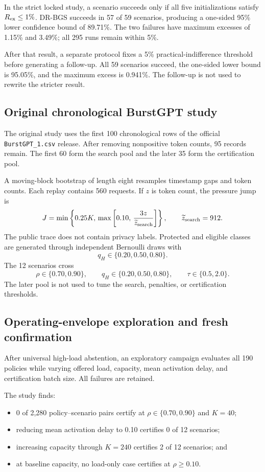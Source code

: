 \documentclass[futureinternet,supfile,submit,moreauthors]{Definitions/mdpi}
\begin{document}
In the strict locked study, a scenario succeeds only if all five
initializations satisfy \(R_{\rm ex}\leq1\%\). DR-BGS succeeds in 57 of 59
scenarios, producing a one-sided 95\% lower confidence bound of 89.71\%.
The two failures have maximum excesses of 1.15\% and 3.49\%; all 295 runs
remain within 5\%.

After that result, a separate protocol fixes a 5\% practical-indifference
threshold before generating a follow-up. All 59 scenarios succeed, the
one-sided lower bound is 95.05\%, and the maximum excess is 0.941\%. The
follow-up is not used to rewrite the stricter result.

\subsection{Original chronological BurstGPT study}

The original study uses the first 100 chronological rows of the official
\texttt{BurstGPT\_1.csv} release. After removing nonpositive token counts,
95 records remain. The first 60 form the search pool and the later 35 form
the certification pool.

A moving-block bootstrap of length eight resamples timestamp gaps and token
counts. Each replay contains 560 requests. If \(z\) is token count, the
pressure jump is
\[
J
=
\min
\left\{
0.25K,\,
\max
\left[
0.10,\,
\frac{3z}{\widetilde z_{\rm search}}
\right]
\right\},
\qquad
\widetilde z_{\rm search}=912.
\]
The public trace does not contain privacy labels. Protected and eligible
classes are generated through independent Bernoulli draws with
\[
q_H\in\{0.20,0.50,0.80\}.
\]
The 12 scenarios cross
\[
\rho\in\{0.70,0.90\},
\qquad
q_H\in\{0.20,0.50,0.80\},
\qquad
\tau\in\{0.5,2.0\}.
\]
The later pool is not used to tune the search, penalties, or certification
thresholds.

\subsection{Operating-envelope exploration and fresh confirmation}

After universal high-load abstention, an exploratory campaign evaluates all
190 policies while varying offered load, capacity, mean activation delay, and
certification batch size. All failures are retained.

The study finds:

\begin{itemize}
\item 0 of 2,280 policy--scenario pairs certify at
\(\rho\in\{0.70,0.90\}\) and \(K=40\);
\item reducing mean activation delay to 0.10 certifies 0 of 12 scenarios;
\item increasing capacity through \(K=240\) certifies 2 of 12 scenarios; and
\item at baseline capacity, no load-only case certifies at \(\rho\geq0.10\).
\end{itemize}
\end{document}
